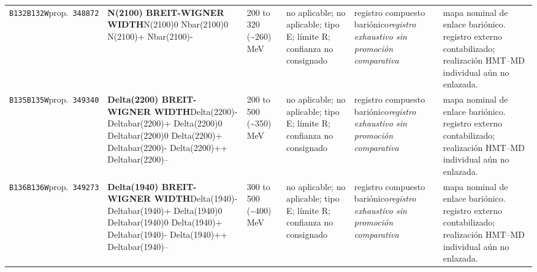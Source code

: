 \begin{landscape}
\begin{longtable}{L{1.85cm}L{4.45cm}L{2.35cm}L{4.05cm}L{3.35cm}L{7.15cm}}
\texttt{B132}\newline \texttt{B132W}\newline prop.\ \texttt{348872} & \textbf{N(2100) BREIT-WIGNER WIDTH}\newline N(2100)0 \textbar{}\allowbreak{} Nbar(2100)0 \textbar{}\allowbreak{} N(2100)+ \textbar{}\allowbreak{} Nbar(2100)- & 200 to 320 (\textasciitilde{}260)\,MeV & no aplicable; no aplicable; tipo E; límite R; confianza no consignado & registro compuesto bariónico\newline \emph{registro exhaustivo sin promoción comparativa} & mapa nominal de enlace bariónico. registro externo contabilizado; realización HMT--MD individual aún no enlazada. \\
\texttt{B135}\newline \texttt{B135W}\newline prop.\ \texttt{349340} & \textbf{Delta(2200) BREIT-WIGNER WIDTH}\newline Delta(2200)- \textbar{}\allowbreak{} Deltabar(2200)+ \textbar{}\allowbreak{} Delta(2200)0 \textbar{}\allowbreak{} Deltabar(2200)0 \textbar{}\allowbreak{} Delta(2200)+ \textbar{}\allowbreak{} Deltabar(2200)- \textbar{}\allowbreak{} Delta(2200)++ \textbar{}\allowbreak{} Deltabar(2200)-- & 200 to 500 (\textasciitilde{}350)\,MeV & no aplicable; no aplicable; tipo E; límite R; confianza no consignado & registro compuesto bariónico\newline \emph{registro exhaustivo sin promoción comparativa} & mapa nominal de enlace bariónico. registro externo contabilizado; realización HMT--MD individual aún no enlazada. \\
\texttt{B136}\newline \texttt{B136W}\newline prop.\ \texttt{349273} & \textbf{Delta(1940) BREIT-WIGNER WIDTH}\newline Delta(1940)- \textbar{}\allowbreak{} Deltabar(1940)+ \textbar{}\allowbreak{} Delta(1940)0 \textbar{}\allowbreak{} Deltabar(1940)0 \textbar{}\allowbreak{} Delta(1940)+ \textbar{}\allowbreak{} Deltabar(1940)- \textbar{}\allowbreak{} Delta(1940)++ \textbar{}\allowbreak{} Deltabar(1940)-- & 300 to 500 (\textasciitilde{}400)\,MeV & no aplicable; no aplicable; tipo E; límite R; confianza no consignado & registro compuesto bariónico\newline \emph{registro exhaustivo sin promoción comparativa} & mapa nominal de enlace bariónico. registro externo contabilizado; realización HMT--MD individual aún no enlazada. \\

\end{longtable}
\end{landscape}
